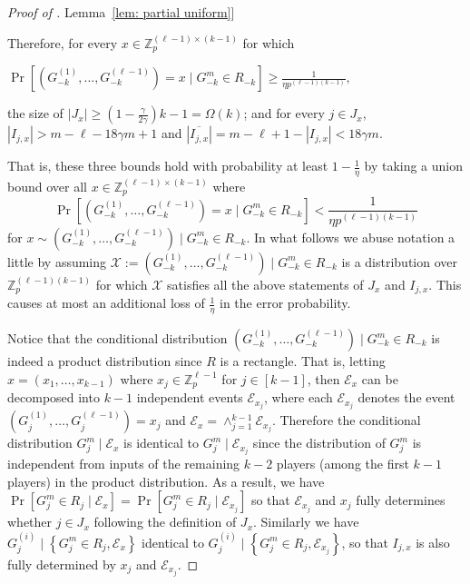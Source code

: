 \documentclass[11pt]{article}
\numberwithin{equation}{section}
\theoremstyle{definition}
\theoremstyle{plain}
\newcommand{\Z}{\mathbb Z}
\newcommand{\expref}[2]{\hyperref[#2]{#1~\ref{#2}}}
\newcommand{\set}[1]{{\left \{{#1} \right \}}}
\newcommand{\cond}{\;|\;}
\newcommand{\Cond}{\;\Big|\;}
\newcommand{\bigomega}[1]{\ensuremath{{\Omega \left( {#1} \right)}}}
\newcommand{\eqdef}{\ensuremath{:=}}
\newcommand{\event}{\ensuremath{\mathcal{E}}}
\begin{document}
\begin{proof}[Proof of \expref{Lemma}{lem: partial uniform}]
		
		Therefore, for every $x\in \Z_p^{(\ell-1)\times(k-1)}$ for which 
		\begin{center}$\Pr\left[\left(G_{-k}^{(1)},\dots,G_{-k}^{(\ell-1)}\right)=x \cond G_{-k}^m\in R_{-k} \right] \ge \frac{1}{\eta  p^{(\ell-1)(k-1)}},$\end{center} 
		the size of $|J_x|\ge \left(1-\frac{\gamma}{2\gamma}\right)k-1=\bigomega{k}$; and for every  $j\in J_x$, 
		$|I_{j,x}|>m-\ell - 18\gamma m + 1$ and $\left|\overline{I_{j,x}}\right|=m-\ell+1 - |I_{j,x}| <18\gamma m$.
		
		That is, these three bounds hold with probability 
		at least $1-\frac{1}{\eta}$ by taking a union bound over all $x \in \Z_p^{(\ell-1)\times(k-1)}$ where
		$$\Pr\left[\left(G_{-k}^{(1)},\dots,G_{-k}^{(\ell-1)}\right)=x \cond G_{-k}^m\in R_{-k} \right] < \frac{1}{\eta  p^{(\ell-1)(k-1)}}$$
		for 
		$x\sim\left(G_{-k}^{(1)},\dots,G_{-k}^{(\ell-1)}\right)\Cond G_{-k}^m\in R_{-k}$.
		In what follows we abuse notation a little by assuming $\mathcal{X}\eqdef \left(G_{-k}^{(1)},\dots,G_{-k}^{(\ell-1)}\right)\Cond G_{-k}^m\in R_{-k}$ is a distribution over $\Z_p^{(\ell-1)(k-1)}$ for which $\mathcal{X}$ satisfies all the above statements of $J_x$ and $I_{j,x}$.
		This causes at most an additional loss of $\frac{1}{\eta}$ in the error probability.


		Notice that 
		the conditional distribution $\left(G_{-k}^{(1)},\dots,G_{-k}^{(\ell-1)}\right)\Cond G_{-k}^m\in R_{-k}$ is indeed a product distribution since $R$ is a rectangle.
		That is, letting $x=(x_1,\dots, x_{k-1})$ where $x_j\in \Z_p^{\ell-1}$ for $j\in [k-1]$,
		then $\event_x$ can be decomposed into $k-1$ independent events $\event_{x_j}$, 
		where each $\event_{x_j}$ denotes the event $\left(G_{j}^{(1)},\dots,G_{j}^{(\ell-1)}\right)=x_j$ and $\event_x=\wedge_{j=1}^{k-1}\event_{x_j}$. 
		Therefore the conditional distribution
		$G^m_j \; \big| \; \event_x$ is identical to $G_j^m \Cond  \event_{x_j}$ since the distribution of $G^m_j$ is independent from inputs of the remaining $k-2$ players (among the first $k-1$ players) in the product distribution. 
		As a result, we have
		$\Pr\left[G^m_j\in R_j\; \big| \; \event_x\right] = \Pr\left[ G_j^m\in R_j \Cond  \event_{x_j} \right]$
		so that $\event_{x_j}$ and $x_j$ fully determines whether $j\in J_x$ following the definition of $J_x$.
		Similarly we have $G_j^{(i)}\Cond \set{G_j^m\in R_j,\event_x}$ identical to $G_j^{(i)}\Cond \set{G_j^m\in R_j,\event_{x_j}}$, 
		so that $I_{j,x}$ is also fully determined by $x_j$ and $\event_{x_j}$.


\end{proof}
\end{document}
